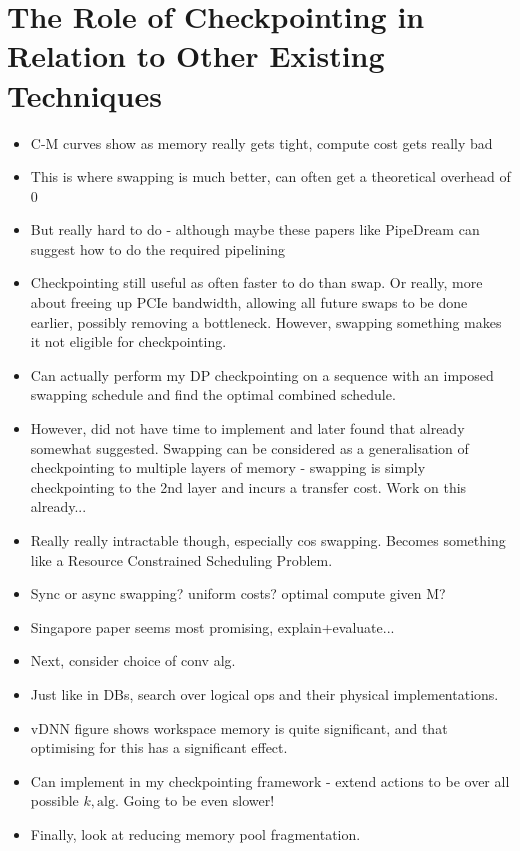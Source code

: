 \section{The Role of Checkpointing in Relation to Other Existing Techniques}
\begin{itemize}[topsep=0.2em]
    \item C-M curves show as memory really gets tight, compute cost gets really bad
    \item This is where swapping is much better, can often get a theoretical overhead of 0
    \item But really hard to do - although maybe these papers like PipeDream can suggest how to do the required pipelining
    \item Checkpointing still useful as often faster to do than swap. Or really, more about freeing up PCIe bandwidth, allowing all future swaps to be done earlier, possibly removing a bottleneck. However, swapping something makes it not eligible for checkpointing.
    \item Can actually perform my DP checkpointing on a sequence with an imposed swapping schedule and find the optimal combined schedule.
    \item However, did not have time to implement and later found that already somewhat suggested.
    Swapping can be considered as a generalisation of checkpointing to multiple layers of memory - swapping is simply checkpointing to the 2nd layer and incurs a transfer cost. Work on this already...
    \item Really really intractable though, especially cos swapping. Becomes something like a Resource Constrained Scheduling Problem.
    \item Sync or async swapping? uniform costs? optimal compute given M?
    \item Singapore paper seems most promising, explain+evaluate...
    \item Next, consider choice of conv alg.
    \item Just like in DBs, search over logical ops and their physical implementations.
    \item vDNN figure shows workspace memory is quite significant, and that optimising for this has a significant effect.
    \item Can implement in my checkpointing framework - extend actions to be over all possible \(k, \mathrm{alg}\). Going to be even slower!
    \item Finally, look at reducing memory pool fragmentation.

\end{itemize}
